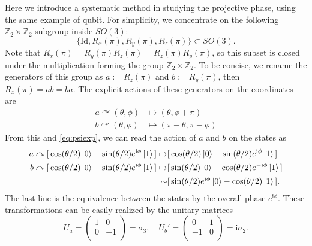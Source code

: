\documentclass[
]{scrartcl}
\numberwithin{equation}{section}
\renewenvironment{align}{\begin{equation}\begin{aligned}}{\end{aligned}\end{equation}}
\theoremstyle{definition}
\theoremstyle{definition}
\theoremstyle{definition}
\theoremstyle{definition}
\theoremstyle{remark}
\begin{document}
Here we introduce a systematic method in studying the projective phase,
using the same example of qubit.
For simplicity, we concentrate on the following \(\mathbb{Z}_2\times \mathbb{Z}_2\) subgroup inside \(SO(3)\):
\begin{equation}
  \label{eq:Z2Z2}
  \{\mathrm{Id}, R_x(\pi), R_y(\pi), R_z(\pi)\} \subset SO(3).
\end{equation}
Note that \(R_x(\pi) = R_y(\pi)R_z(\pi) = R_z(\pi)R_y(\pi)\), so this subset is closed under the multiplication forming the group \(\mathbb{Z}_2\times \mathbb{Z}_2\).
To be concise, we rename the generators of this group as \(a := R_z(\pi)\) and \(b := R_y(\pi)\), then \(R_x(\pi) = ab = ba\).
The explicit actions of these generators on the coordinates are
\begin{align}
  \label{eq:Rxyactions}
  a \curvearrowright (\theta,\phi) &\mapsto (\theta,\phi+\pi)\\
  b \curvearrowright (\theta,\phi) &\mapsto (\pi-\theta,\pi-\phi)
\end{align}
From this and \eqref{eq:psiexp}, we can read the action of \(a\) and \(b\) on the states as
\begin{align}
  \label{eq:abActionPsi}
  a \curvearrowright [\, \cos(\theta/2)\ket{0} + \sin(\theta/2) e^{\mathrm{i}\phi}\ket{1} \,] \mapsto & [\, \cos(\theta/2)\ket{0} - \sin(\theta/2) e^{\mathrm{i}\phi}\ket{1} \,]\\
  b \curvearrowright [\, \cos(\theta/2)\ket{0} + \sin(\theta/2) e^{\mathrm{i}\phi} \ket{1}\,] \mapsto & [\, \sin(\theta/2)\ket{0} - \cos(\theta/2) e^{-\mathrm{i}\phi}\ket{1} \,]\\
   \sim  & [\, \sin(\theta/2)e^{\mathrm{i}\phi}\ket{0} - \cos(\theta/2) \ket{1} \,].
\end{align}
The last line is the equivalence between the states by the overall phase \(e^{\mathrm{i}\phi}\).
These transformations can be easily realized by the unitary matrices
\begin{equation}
  \label{eq:UaUbZ2Z2}
  U_a = 
  \begin{pmatrix}
    1 & 0 \\
    0 & -1 \\
  \end{pmatrix} = \sigma_3,\quad
  U_b' = 
  \begin{pmatrix}
    0 & 1 \\
    -1 & 0 \\
  \end{pmatrix} = \mathrm{i}\sigma_2.
\end{equation}
\end{document}
